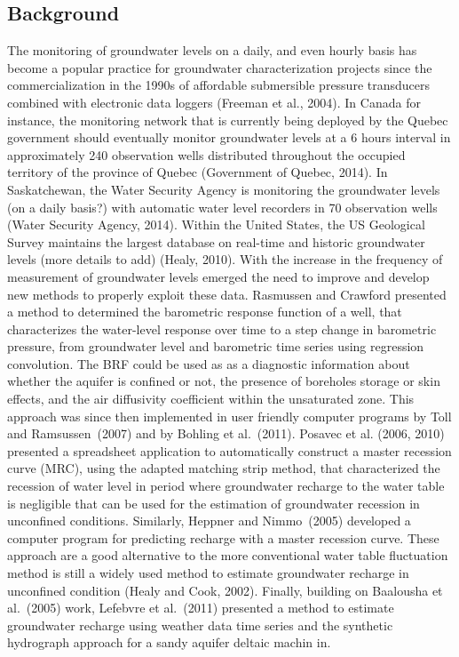 \documentclass[ARTICLETHERMIC.tex]{subfiles}
\begin{document}
\subsection{Background}

The monitoring of groundwater levels on a daily, and even hourly basis has become a popular practice for groundwater characterization projects since the commercialization in the 1990s of affordable submersible pressure transducers combined with electronic data loggers (Freeman et al., 2004). In Canada for instance, the monitoring network that is currently being deployed by the Quebec government should eventually monitor groundwater levels at a 6 hours interval in approximately 240 observation wells distributed throughout the occupied territory of the province of Quebec (Government of Quebec, 2014). In Saskatchewan, the Water Security Agency is monitoring the groundwater levels (on a daily basis?) with automatic water level recorders in 70 observation wells (Water Security Agency, 2014). Within the United States, the US Geological Survey maintains the largest database on real-time and historic groundwater levels (more details to add) (Healy, 2010).
With the increase in the frequency of measurement of groundwater levels emerged the need to improve and develop new methods to properly exploit these data. Rasmussen and Crawford presented a method to determined the barometric response function of a well, that characterizes the water-level response over time to a step change in barometric pressure, from groundwater level and barometric time series using regression convolution. The BRF could be used as as a diagnostic information about whether the aquifer is confined or not, the presence of boreholes storage or skin effects, and the air diffusivity coefficient within the unsaturated zone. This approach was since then implemented in user friendly computer programs by Toll and Ramsussen (2007) and by Bohling et al. (2011). Posavec et al. (2006, 2010) presented a spreadsheet application to automatically construct a master recession curve (MRC), using the adapted matching strip method, that characterized the recession of water level in period where groundwater recharge to the water table is negligible that can be used for the estimation of groundwater recession in unconfined conditions. Similarly, Heppner and Nimmo (2005) developed a computer program for predicting recharge with a master recession curve. These approach are a good alternative to the more conventional water table fluctuation method is still a widely used method to estimate groundwater recharge in unconfined condition (Healy and Cook, 2002). Finally, building on Baalousha et al. (2005) work, Lefebvre et al. (2011) presented a method to estimate groundwater recharge using weather data time series and the synthetic hydrograph approach for a sandy aquifer deltaic machin in.
\end{document}
